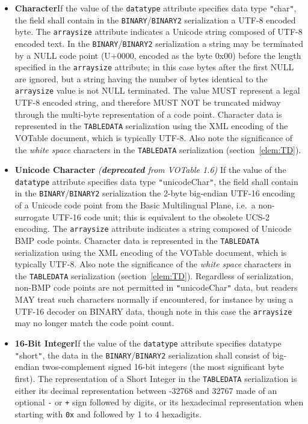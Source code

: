 \documentclass[11pt,a4paper]{ivoa}
\def\Arefs#1{section~\ref{#1}}
\let\fg=\color
\def\attr#1{{\tt{\fg{DarkRed}#1}}}
\def\elem#1{{\tt{\fg{DarkRed}#1}}}
\def\literalvalue#1{{\tt"}{{\fg{DarkPurple}#1}}{\tt"}}
\begin{document}
\begin{itemize}
\item {\bf Character}\quad If the value of the {\attr{datatype}}
attribute specifies data type {\literalvalue{char}},
the field shall contain in the \elem{BINARY}/\elem{BINARY2} serialization
a UTF-8 encoded byte.
The \attr{arraysize} attribute
indicates a Unicode string composed of UTF-8 encoded text.
In the \elem{BINARY}/\elem{BINARY2} serialization
a string may be terminated by a NULL code point
(U+0000, encoded as the byte 0x00)
before the length specified in the \attr{arraysize} attribute;
in this case bytes after the first NULL are ignored,
but a string having the number of bytes identical to
the \attr{arraysize} value is not NULL terminated.
The value MUST represent a legal UTF-8 encoded string,
and therefore MUST NOT be truncated midway through the multi-byte
representation of a code point.
Character data is represented in the \elem{TABLEDATA} serialization
using the XML encoding of the VOTable document, which is typically UTF-8.
Also note the significance of the {\em white space} characters
in the \elem{TABLEDATA} serialization
(\Arefs{elem:TD}).

\item {\bf Unicode Character}
\emph{(\textbf{deprecated} from VOTable 1.6)}\quad
If the value of the {\attr{datatype}}
attribute specifies data type {\literalvalue{unicodeChar}},
the field shall contain in the \elem{BINARY}/\elem{BINARY2} serialization
the 2-byte big-endian UTF-16 encoding
of a Unicode code point from the Basic Multilingual Plane,
i.e.\ a non-surrogate UTF-16 code unit;
this is equivalent to the obsolete UCS-2 encoding.
The \attr{arraysize} attribute
indicates a string composed of Unicode BMP code points.
Character data is represented in the \elem{TABLEDATA} serialization
using the XML encoding of the VOTable document, which is typically UTF-8.
Also note the significance of the {\em white space} characters
in the \elem{TABLEDATA} serialization
(\Arefs{elem:TD}).
Regardless of serialization, non-BMP code points
are not permitted in \literalvalue{unicodeChar} data,
but readers MAY treat such characters normally
if encountered, for instance by using a UTF-16 decoder on BINARY data,
though note in this case the \attr{arraysize}
may no longer match the code point count.

\item {\bf 16-Bit Integer}\quad If the value of the {\attr{datatype}}
attribute specifies datatype {\literalvalue{short}},
the data in the \elem{BINARY}/\elem{BINARY2} serialization shall consist of
big-endian twos-complement signed 16-bit integers
(the most significant byte first).
The representation of a Short Integer in the \elem{TABLEDATA} serialization
is either its decimal representation between -32768 and 32767
made of an optional {\tt-} or {\tt+} sign followed by digits,
or its hexadecimal representation when starting with {\tt0x}
and followed by 1 to 4 hexadigits.


\end{itemize}
\end{document}
